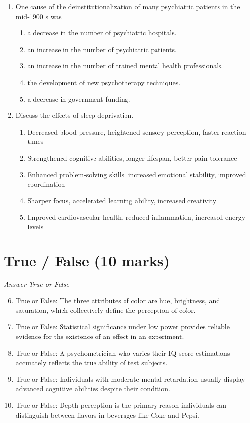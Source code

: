\documentclass[12pt]{article}
\begin{document}
\begin{enumerate}[label=\arabic*.]
\begin{enumerate}[label=(\alph*)]
\end{enumerate}
\item One cause of the deinstitutionalization of many psychiatric patients in the mid-1900 s was
\begin{enumerate}[label=(\alph*)]
    \item a decrease in the number of psychiatric hospitals.
    \item an increase in the number of psychiatric patients.
    \item an increase in the number of trained mental health professionals.
    \item the development of new psychotherapy techniques.
    \item a decrease in government funding.
\end{enumerate}
\item Discuss the effects of sleep deprivation.
\begin{enumerate}[label=(\alph*)]
    \item Decreased blood pressure, heightened sensory perception, faster reaction times
    \item Strengthened cognitive abilities, longer lifespan, better pain tolerance
    \item Enhanced problem-solving skills, increased emotional stability, improved coordination
    \item Sharper focus, accelerated learning ability, increased creativity
    \item Improved cardiovascular health, reduced inflammation, increased energy levels
\end{enumerate}
\end{enumerate}

\section*{True / False (10 marks)}
\textit{Answer True or False}
\begin{enumerate}[label=\arabic*.]
\setcounter{enumi}{5}
\item True or False: The three attributes of color are hue, brightness, and saturation, which collectively define the perception of color.
\item True or False: Statistical significance under low power provides reliable evidence for the existence of an effect in an experiment.
\item True or False: A psychometrician who varies their IQ score estimations accurately reflects the true ability of test subjects.
\item True or False: Individuals with moderate mental retardation usually display advanced cognitive abilities despite their condition.
\item True or False: Depth perception is the primary reason individuals can distinguish between flavors in beverages like Coke and Pepsi.
\end{enumerate}
\end{document}

